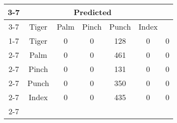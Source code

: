 \documentclass{standalone}
\begin{document}
 
 \begin{tabular}{|c |c |c |c |c |c |c |}
\cline{3-7}\multicolumn{2}{c|}{} & \multicolumn{5}{c|}{Predicted} \\ 
\cline{3-7} \multicolumn{2}{c |}{ } & Tiger & Palm & Pinch & Punch & Index\\ 
\cline{1-7}\multirow{5}{*}{\rotatebox[origin=c]{90}{Actual}} & Tiger & 0 & 0 & 128 & 0 & 0\\ 
 \cline{2-7} & Palm & 0 & 0 & 461 & 0 & 0\\ 
 \cline{2-7} & Pinch & 0 & 0 & 131 & 0 & 0\\ 
 \cline{2-7} & Punch & 0 & 0 & 350 & 0 & 0\\ 
 \cline{2-7} & Index & 0 & 0 & 435 & 0 & 0\\ 
 \cline{2-7}\hline \end{tabular}
 
\end{document}

